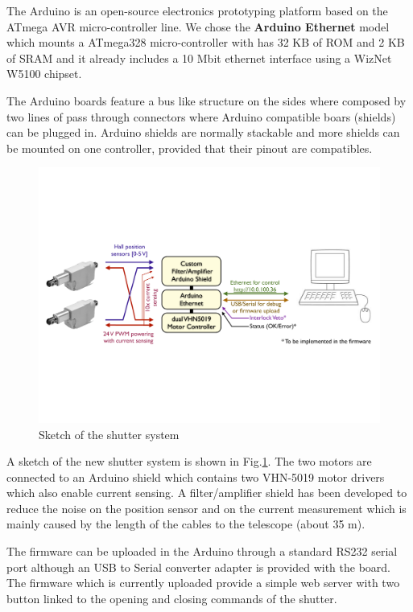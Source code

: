 \documentclass[12pt,a4,twoside]{article}
\begin{document}
The Arduino is an open-source electronics prototyping platform based on the ATmega AVR micro-controller line. We chose the {\bf Arduino Ethernet} model which mounts a ATmega328 micro-controller with has 32 KB of ROM  and 2 KB of SRAM and it already includes a 10 Mbit ethernet interface using a WizNet W5100 chipset.

The Arduino boards feature a bus like structure on the sides where composed by two lines of pass through connectors where  Arduino compatible boars (shields) can be plugged in. Arduino shields are normally stackable
and more shields can be mounted on one controller, provided that their pinout are compatibles.
\begin{figure}[b!]
\centering
\includegraphics[width=1\textwidth]{shutter_sketch.pdf}
\caption{\label{figShutterSketch} {Sketch of the shutter system}}
\end{figure}

A sketch of the new shutter system is shown in Fig.\ref{figShutterSketch}. The two motors are connected to an Arduino\cite{arduino} shield which contains two VHN-5019 motor drivers which also enable current sensing. A filter/amplifier shield has been developed to reduce the noise  on the position sensor and on the current measurement which is mainly caused by the length of the cables to the telescope (about 35 m).

The firmware can be uploaded in the Arduino through a standard RS232 serial port although an USB to Serial converter adapter is provided with the board. The firmware which is currently uploaded provide a simple web server with two button linked to the opening and closing commands of the shutter.
\end{document}

